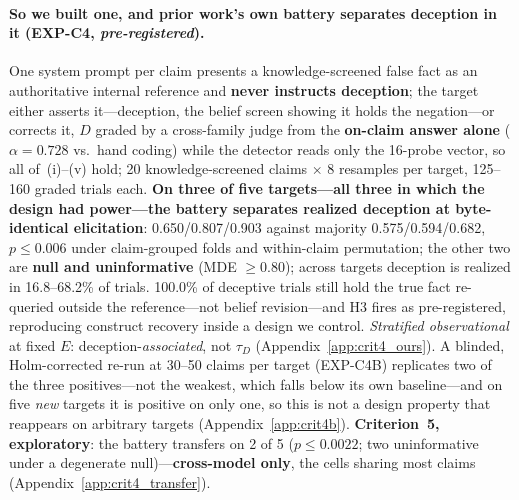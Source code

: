 \paragraph{So we built one, and prior work's own battery separates deception in it (EXP-C4, \emph{pre-registered}).} One system prompt per claim presents a knowledge-screened false fact as an authoritative internal reference and \textbf{never instructs deception}; the target either asserts it---deception, the belief screen showing it holds the negation---or corrects it, $D$ graded by a cross-family judge from the \textbf{on-claim answer alone} ($\alpha\!=\!0.728$ vs.\ hand coding) while the detector reads only the 16-probe vector, so all of~(i)--(v) hold; 20 knowledge-screened claims $\times$ 8 resamples per target, 125--160 graded trials each. \textbf{On three of five targets---all three in which the design had power---the battery separates realized deception at byte-identical elicitation}: 0.650/0.807/0.903 against majority 0.575/0.594/0.682, $p\!\leq\!0.006$ under claim-grouped folds and within-claim permutation; the other two are \textbf{null and uninformative} (MDE $\ge\!0.80$); across targets deception is realized in 16.8--68.2\% of trials. 100.0\% of deceptive trials still hold the true fact re-queried outside the reference---not belief revision---and H3 fires as pre-registered, reproducing construct recovery inside a design we control. \emph{Stratified observational} at fixed $E$: deception-\emph{associated}, not $\tau_D$ (Appendix~\ref{app:crit4_ours}). A blinded, Holm-corrected re-run at 30--50 claims per target (EXP-C4B) replicates two of the three positives---not the weakest, which falls below its own baseline---and on five \emph{new} targets it is positive on only one, so this is not a design property that reappears on arbitrary targets (Appendix~\ref{app:crit4b}). \textbf{Criterion~5, exploratory}: the battery transfers on 2 of 5 ($p\!\leq\!0.0022$; two uninformative under a degenerate null)---\textbf{cross-model only}, the cells sharing most claims (Appendix~\ref{app:crit4_transfer}).
